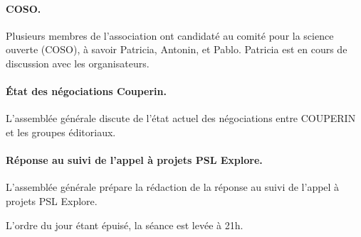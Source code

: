 \documentclass{scrartcl}
\begin{document}
\paragraph{COSO.}
Plusieurs membres de l'association ont candidaté au comité pour la science
ouverte (COSO), à savoir Patricia, Antonin, et Pablo. Patricia est en cours de
discussion avec les organisateurs.

\paragraph{État des négociations Couperin.}
L'assemblée générale discute de l'état actuel des négociations entre COUPERIN et
les groupes éditoriaux.

\paragraph{Réponse au suivi de l'appel à projets PSL Explore.}
L'assemblée générale prépare la rédaction de la réponse au suivi de l'appel à
projets PSL Explore.

\bigskip

L'ordre du jour étant épuisé, la séance est levée à 21h.
\end{document}

